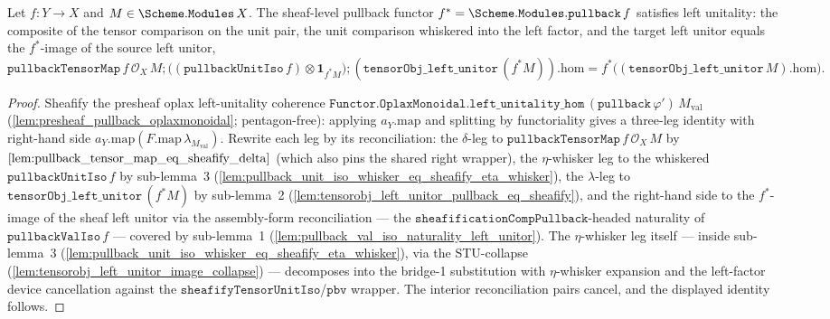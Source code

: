 \begin{lemma}


  \label{lem:pullback_tensor_map_left_unitality}
  Let \(f : Y \to X\) and \(M \in \Scheme.\mathtt{Modules}\,X\). The sheaf-level pullback functor
  \(f^{*} = \Scheme.\mathtt{Modules.pullback}\,f\) satisfies left unitality: the composite of the
  tensor comparison on the unit pair, the unit comparison whiskered into the left factor, and the
  target left unitor equals the \(f^{*}\)-image of the source left unitor,
  \[
    \mathtt{pullbackTensorMap}\,f\,\mathcal{O}_X\,M
      \mathbin{;} \bigl((\mathtt{pullbackUnitIso}\,f) \otimes \mathbf 1_{f^{*}M}\bigr)
      \mathbin{;} (\mathtt{tensorObj\_left\_unitor}\,(f^{*}M)).\mathrm{hom}
    = f^{*}\bigl((\mathtt{tensorObj\_left\_unitor}\,M).\mathrm{hom}\bigr).
  \]
\end{lemma}
\begin{proof}
  \leanok
  Sheafify the presheaf oplax left-unitality coherence
  \(\mathtt{Functor.OplaxMonoidal.left\_unitality\_hom}\,(\mathtt{pullback}\,\varphi')\,
  M_{\mathrm{val}}\) (\cref{lem:presheaf_pullback_oplaxmonoidal}; pentagon-free): applying
  \(a_Y.\mathrm{map}\) and splitting by functoriality gives a three-leg identity with right-hand side
  \(a_Y.\mathrm{map}(F.\mathrm{map}\,\lambda_{M_{\mathrm{val}}})\). Rewrite each leg by its
  reconciliation: the \(\delta\)-leg to \(\mathtt{pullbackTensorMap}\,f\,\mathcal{O}_X\,M\) by
  \(\cref{lem:pullback_tensor_map_eq_sheafify_delta}\) (which also pins the shared right wrapper), the
  \(\eta\)-whisker leg to the whiskered \(\mathtt{pullbackUnitIso}\,f\) by sub-lemma~3
  (\cref{lem:pullback_unit_iso_whisker_eq_sheafify_eta_whisker}), the \(\lambda\)-leg to
  \(\mathtt{tensorObj\_left\_unitor}\,(f^{*}M)\) by sub-lemma~2
  (\cref{lem:tensorobj_left_unitor_pullback_eq_sheafify}), and the right-hand side to the
  \(f^{*}\)-image of the sheaf left unitor via the assembly-form reconciliation --- the
  \(\mathtt{sheafificationCompPullback}\)-headed naturality of \(\mathtt{pullbackValIso}\,f\) ---
  covered by sub-lemma~1 (\cref{lem:pullback_val_iso_naturality_left_unitor}). The
  \(\eta\)-whisker leg itself --- inside sub-lemma~3 (\cref{lem:pullback_unit_iso_whisker_eq_sheafify_eta_whisker}),
  via the STU-collapse (\cref{lem:tensorobj_left_unitor_image_collapse}) --- decomposes into the
  bridge-1 substitution with \(\eta\)-whisker expansion and the left-factor device cancellation against
  the \(\mathtt{sheafifyTensorUnitIso}\)/\(\mathtt{pbv}\) wrapper. The interior reconciliation pairs
  cancel, and the displayed identity follows.
\end{proof}

